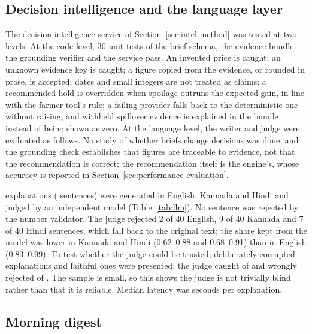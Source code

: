 \subsection{Decision intelligence and the language layer}
\label{sec:llm-results}

The decision-intelligence service of Section~\ref{sec:intel-method} was tested at two levels. At the code level, 30 unit tests of the brief schema, the evidence bundle, the grounding verifier and the service pass. An invented price is caught; an unknown evidence key is caught; a figure copied from the evidence, or rounded in prose, is accepted; dates and small integers are not treated as claims; a recommended hold is overridden when spoilage outruns the expected gain, in line with the farmer tool's rule; a failing provider falls back to the deterministic one without raising; and withheld spillover evidence is explained in the bundle instead of being shown as zero. At the language level, the writer and judge were evaluated as follows. No study of whether briefs change decisions was done, and the grounding check establishes that figures are traceable to evidence, not that the recommendation is correct; the recommendation itself is the engine's, whose accuracy is reported in Section~\ref{sec:performance-evaluation}.

\LlmExplanations{} explanations (\LlmSentences{} sentences) were generated in English, Kannada and Hindi and judged by an independent model (Table~\ref{tab:llm}). No sentence was rejected by the number validator. The judge rejected 2 of 40 English, 9 of 40 Kannada and 7 of 40 Hindi sentences, which fall back to the original text; the share kept from the model was lower in Kannada and Hindi (0.62--0.88 and 0.68--0.91) than in English (0.83--0.99). To test whether the judge could be trusted, \JudgeBad{} deliberately corrupted explanations and \JudgeGood{} faithful ones were presented: the judge caught \JudgeCaught{} of \JudgeBad{} and wrongly rejected \JudgeFalse{} of \JudgeGood{}. The sample is small, so this shows the judge is not trivially blind rather than that it is reliable. Median latency was \LlmLatency{} seconds per explanation.

\begin{table}[!t]
\centering
\caption{Explanation evaluation by language}
\label{tab:llm}
\end{table}

\subsection{Morning digest}

